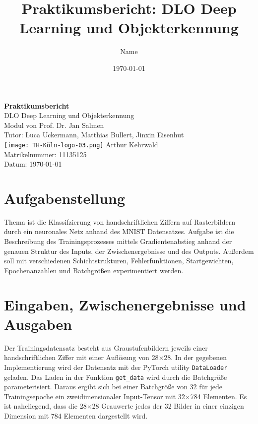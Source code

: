 \documentclass[12pt, a4paper]{report}
\title{Praktikumsbericht: DLO Deep Learning und Objekterkennung}
\author{Name}
\date{\today}
\begin{document}
\begin{titlepage}
    \begin{center}
        \vspace*{2cm}
        \huge
        \textbf{Praktikumsbericht}\\
        \vspace{1cm}
        \LARGE
        DLO Deep Learning und Objekterkennung\\
        \vspace{1cm}
        \large
        Modul von Prof. Dr. Jan Salmen\\
        Tutor: Luca Uckermann, Matthias Bullert, Jinxin Eisenhut\\
        \vspace{2cm}
        \texttt{[image: TH-Köln-logo-03.png]}
        \vfill
        \large
        Arthur Kehrwald\\
        Matrikelnummer: 11135125\\
        Datum: \today
    \end{center}
\end{titlepage}


\section{Aufgabenstellung}

Thema ist die Klassifzierung von handschriftlichen Ziffern auf Rasterbildern durch ein neuronales Netz anhand des MNIST Datensatzes.
Aufgabe ist die Beschreibung des Trainingsprozesses mittels Gradientenabstieg anhand der genauen Struktur des Inputs, der Zwischenergebnisse und des Outputs.
Außerdem soll mit verschiedenen Schichtstrukturen, Fehlerfunktionen, Startgewichten, Epochenanzahlen und Batchgrößen experimentiert werden.

\section{Eingaben, Zwischenergebnisse und Ausgaben}

Der Trainingsdatensatz besteht aus Graustufenbildern jeweils einer handschriftlichen Ziffer mit einer Auflösung von 28$\times$28.
In der gegebenen Implementierung wird der Datensatz mit der PyTorch utility \texttt{DataLoader} geladen.
Das Laden in der Funktion \texttt{get\_data} wird durch die Batchgröße parameterisiert.
Daraus ergibt sich bei einer Batchgröße von 32 für jede Trainingsepoche ein zweidimensionaler Input-Tensor mit 32$\times$784 Elementen.
Es ist naheliegend, dass die 28$\times$28 Grauwerte jedes der 32 Bilder in einer einzigen Dimension mit 784 Elementen dargestellt wird.\\
\end{document}
